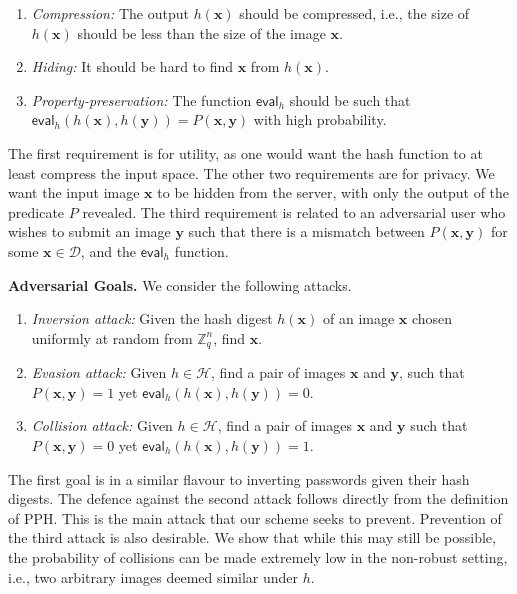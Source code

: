 \documentclass[pdflatex,sn-mathphys-num]{sn-jnl}
\newcommand{\descr}[1]{\vspace{0.2cm} \noindent \textbf{#1}}
\theoremstyle{definition}
\newcommand{\vtr}[1]{\mathbf{#1}}
\newcommand{\norm}[1]{\lVert{#1}\rVert}
\newcommand{\eval}[1]{\mathsf{eval}(#1)}
\newcommand{\database}{\mathcal{D}}
\newcommand{\adv}[1]{\mathcal{#1}}
\begin{document}
\begin{enumerate}
    \item \textit{Compression:} The output $h(\vtr{x})$ should be compressed, i.e., the size of $h(\vtr{x})$ should be less than the size of the image $\vtr{x}$.
    \item \textit{Hiding:} It should be hard to find $\vtr{x}$ from $h(\vtr{x})$.
    \item \textit{Property-preservation:} The function $\mathsf{eval}_{h}$ should be such that $\mathsf{eval}_h(h(\vtr{x}), h(\vtr{y})) = P(\vtr{x}, \vtr{y})$ with high probability.
\end{enumerate}
The first requirement is for utility, as one would want the hash function to at least compress the input space. The other two requirements are for privacy. We want the input image $\vtr{x}$ to be hidden from the server, with only the output of the predicate $P$ revealed. The third requirement is related to an adversarial user who wishes to submit an image $\vtr{y}$ such that there is a mismatch between $P(\vtr{x}, \vtr{y})$ for some $\vtr{x} \in \database$, and the $\mathsf{eval}_h$ function.  

\descr{Adversarial Goals.} We consider the following attacks. 
\begin{enumerate}
    \item \emph{Inversion attack:} Given the hash digest $h(\vtr{x})$ of an image $\vtr{x}$ chosen uniformly at random from $\mathbb{Z}_q^n$, find $\vtr{x}$. 
    \item \emph{Evasion attack:} Given $h \in \mathcal{H}$, find a pair of images $\vtr{x}$ and $\vtr{y}$, such that $P(\vtr{x}, \vtr{y}) = 1$ yet $\mathsf{eval}_h(h(\vtr{x}), h(\vtr{y})) = 0$.
    \item \emph{Collision attack:} Given $h \in \mathcal{H}$, find a pair of images $\vtr{x}$ and $\vtr{y}$ such that $P(\vtr{x}, \vtr{y}) = 0$ yet $\mathsf{eval}_h(h(\vtr{x}), h(\vtr{y})) = 1$.
\end{enumerate}
The first goal is in a similar flavour to inverting passwords given their hash digests. %
The defence against the second attack follows directly from the definition of PPH. This is the main attack that our scheme seeks to prevent. Prevention of the third attack is also desirable. We show that while this may still be possible, the probability of collisions can be made extremely low in the non-robust setting, i.e., two arbitrary images deemed similar under $h$. 
\end{document}
